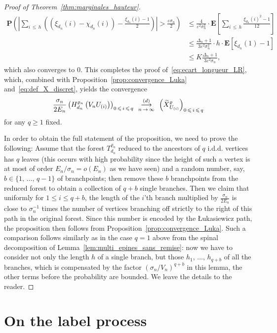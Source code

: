 \documentclass[10pt]{amsart}
\theoremstyle{definition}\newtheorem{defi}[theo]{Definition}\newtheorem{rema}[theo]{Remark}\newtheorem{exam}[theo]{Example}\newtheorem{exem}[theo]{Example}\newtheorem{nota}[theo]{Notation}
\newcommand{\ensembles}[1]{\mathbf{#1}}
\renewcommand{\P}{\ensembles{P}}
\newcommand{\E}{\ensembles{E}}
\renewcommand{\Pr}[1]{\P\left(#1\right)}
\newcommand{\Es}[1]{\E\left[#1\right]}
\newcommand{\1}{\ensembles{1}}
\newcommand{\tildep}[1]{\widetilde{#1}\vphantom{#1}}
\renewcommand{\le}{\leqslant}
\renewcommand{\ge}{\geqslant}
\newcommand{\fn}{T_{d_n}^{\varrho_n}}
\newcommand{\Hfn}{H_{d_n}^{\varrho_n}}
\newcommand{\tX}{\tildep{X}^{\varrho}}
\newcommand{\edges}{E}
\newcommand{\vertices}{V}
\newcommand{\cvloi}[1][n]{\enskip\mathop{\longrightarrow}^{(d)}_{#1\,\to\, \infty}\enskip}
\providecommand{\?}{}
\begin{document}
\begin{proof}[Proof of Theorem~\ref{thm:marginales_hauteur}]
\begin{align*}
\Pr{\left|\sum_{i\,\le\,h} \left(\left(\xi_{d_n}(i) - \chi_{d_n}(i)\right) - \frac{\xi_{d_n}(i) - 1}{2}\right)\right| > \frac{\varepsilon \sigma_n}{2}}
&\le \frac{4}{\varepsilon^2 \sigma_n^2} \cdot \Es{\sum_{i\,\le\,h} \frac{\xi_{d_n}(i)^2 - 1}{12}}
\\
&\le \frac{\Delta_n+1}{3 \varepsilon^2 \sigma_n^2} \cdot h \cdot \Es{\xi_{d_n}(1) - 1}
\\
&\le K \frac{\Delta_n+1}{3 \varepsilon^2 \sigma_n},
\end{align*}
which also converges to $0$. This completes the proof of~\eqref{eq:ecart_longueur_LR}, which, combined with Proposition~\ref{prop:convergence_Luka} and~\eqref{eq:def_X_discret}, yields the convergence
\[
\frac{\sigma_n}{2 \edges_n} \left(\Hfn\left(\vertices_n U_{(i)}\right)\right)_{0\,\le\,i\,\le\,q}
\cvloi
\left(\tX_{U_{(i)}}\right)_{0\,\le\,i\,\le\,q}
\]
for any $q \ge 1$ fixed.

In order to obtain the full statement of the proposition, we need to prove the following: Assume that the forest $\fn$ reduced to the ancestors of $q$ i.d.d. vertices has $q$ leaves (this occurs with high probability since the height of such a vertex is at most of order $\edges_n / \sigma_n = o(\edges_n)$ as we have seen) and a random number, say, $b \in \{1,\,\dots,\, q-1\}$ of branchpoints; then remove these $b$ branchpoints from the reduced forest to obtain a collection of $q+b$ single branches. Then we claim that uniformly for $1 \le i \le q+b$, the length of the $i$'th branch multiplied by $\frac{\sigma_n}{2 \edges_n}$ is close to $\sigma_n^{-1}$ times the number of vertices branching off strictly to the right of this path in the original forest. Since this number is encoded by the {\L}ukasiewicz path, the proposition then follows from Proposition~\ref{prop:convergence_Luka}. Such a comparison follows similarly as in the case $q=1$ above from the spinal decomposition of Lemma~\ref{lem:multi_epines_sans_remise}: now we have to consider not only the length $h$ of a single branch, but those $h_1,\,\dots,\,h_{q+b}$ of all the branches, which is compensated by the factor $(\sigma_n / \vertices_n)^{q+b}$ in this lemma, the other terms before the probability are bounded. We leave the details to the reader.
\end{proof}



\section{On the label process}\label{sec:etiquettes}
\end{document}
